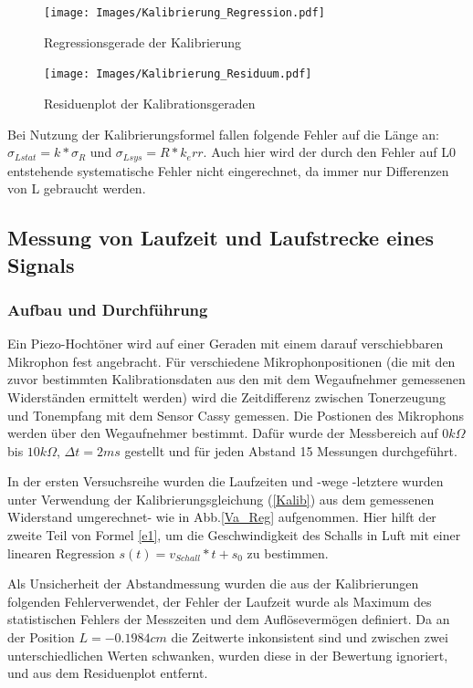 \documentclass[]{article}
\begin{document}
	\begin{figure}
	\begin{center}
		\texttt{[image: Images/Kalibrierung\_Regression.pdf]}
		\caption{Regressionsgerade der Kalibrierung}             
		\label{Kalib_Reg}               
	\end{center}            
	\end{figure} 

	\begin{figure}
	\begin{center}
		\texttt{[image: Images/Kalibrierung\_Residuum.pdf]}
		\caption{Residuenplot der Kalibrationsgeraden}
		\label{Kalib_Res}
	\end{center}
	\end{figure}

	Bei Nutzung der Kalibrierungsformel fallen folgende Fehler auf die Länge an: $\sigma_{Lstat}=k*\sigma_R$ und $\sigma_{Lsys}=R*k_err$. Auch hier wird der durch den Fehler auf L0 entstehende systematische Fehler nicht eingerechnet, da immer nur Differenzen von L gebraucht werden.

	\subsection{Messung von Laufzeit und Laufstrecke eines Signals}
	\subsubsection{Aufbau und Durchführung}
	Ein Piezo-Hochtöner wird auf einer Geraden mit einem darauf verschiebbaren Mikrophon fest angebracht. Für verschiedene Mikrophonpositionen (die mit den zuvor bestimmten Kalibrationsdaten aus den mit dem Wegaufnehmer gemessenen Widerständen ermittelt werden) wird die Zeitdifferenz zwischen Tonerzeugung und Tonempfang mit dem Sensor Cassy gemessen.  Die Postionen des Mikrophons werden über den Wegaufnehmer bestimmt. Dafür wurde der Messbereich auf $0k\Omega$ bis $10k\Omega$, $\Delta t=2ms$ gestellt und für jeden Abstand 15 Messungen durchgeführt.

	In der ersten Versuchsreihe wurden die Laufzeiten und -wege -letztere wurden unter Verwendung der Kalibrierungsgleichung (\ref{Kalib}) aus dem gemessenen Widerstand umgerechnet- wie in Abb.\ref{Va_Reg} aufgenommen. Hier hilft der zweite Teil von Formel \ref{e1}, um die Geschwindigkeit des Schalls in Luft mit einer linearen Regression $s(t)=v_{Schall}*t+s_0$ zu bestimmen. 
	
	
 	Als Unsicherheit der Abstandmessung wurden die aus der Kalibrierungen folgenden Fehlerverwendet, der Fehler der Laufzeit wurde als Maximum des statistischen Fehlers der Messzeiten und dem Auflösevermögen definiert. Da an der Position $L = -0.1984 cm$ die Zeitwerte inkonsistent sind und zwischen zwei unterschiedlichen Werten schwanken, wurden diese in der Bewertung ignoriert, und aus dem Residuenplot entfernt.\\
	
\end{document}
